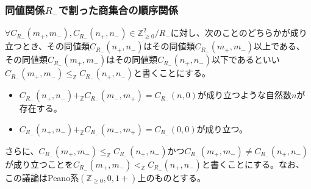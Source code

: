 \documentclass[dvipdfmx]{jsarticle}
\begin{document}
\subsubsection{同値関係$R_{-}$で割った商集合の順序関係}%
\begin{dfn}
$\forall C_{R_{-}}\left( m_{+},m_{-} \right),C_{R_{-}}\left( n_{+},n_{-} \right) \in \mathbb{Z}_{\geq 0}^{2} /R_{-} $に対し、次のことのどちらかが成り立つとき、その同値類$C_{R_{-}}\left( n_{+},n_{-} \right)$はその同値類$C_{R_{-}}\left( m_{+},m_{-} \right)$以上である、その同値類$C_{R_{-}}\left( m_{+},m_{-} \right)$はその同値類$C_{R_{-}}\left( n_{+},n_{-} \right)$以下であるといい$C_{R_{-}}\left( m_{+},m_{-} \right) \leq_{\mathbb{Z}}C_{R_{-}}\left( n_{+},n_{-} \right)$と書くことにする。
\end{dfn}
\begin{itemize}
\item
  $C_{R_{-}}\left( n_{+},n_{-} \right) +_{\mathbb{Z}}C_{R_{-}}\left( m_{-},m_{+} \right) = C_{R_{-}}(n,0)$が成り立つような自然数$n$が存在する。
\item
  $C_{R_{-}}\left( n_{+},n_{-} \right) +_{\mathbb{Z}}C_{R_{-}}\left( m_{-},m_{+} \right) = C_{R_{-}}(0,0)$が成り立つ。
\end{itemize}\par
さらに、$C_{R_{-}}\left( m_{+},m_{-} \right) \leq_{\mathbb{Z}}C_{R_{-}}\left( n_{+},n_{-} \right)$かつ$C_{R_{-}}\left( m_{+},m_{-} \right) \neq C_{R_{-}}\left( n_{+},n_{-} \right)$が成り立つことを$C_{R_{-}}\left( m_{+},m_{-} \right) <_{\mathbb{Z}}C_{R_{-}}\left( n_{+},n_{-} \right)$と書くことにする。なお、この議論はPeano系$\left( \mathbb{Z}_{\geq 0},0,1 + \right)$上のものとする。
\end{document}
